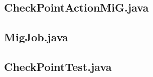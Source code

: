 \begin{landscape}
\subsection{CheckPointActionMiG.java}\label{checkpointactionmig}

\subsection{MigJob.java}\label{migjob}

\subsection{CheckPointTest.java}\label{checkpointtest}

\end{landscape}
